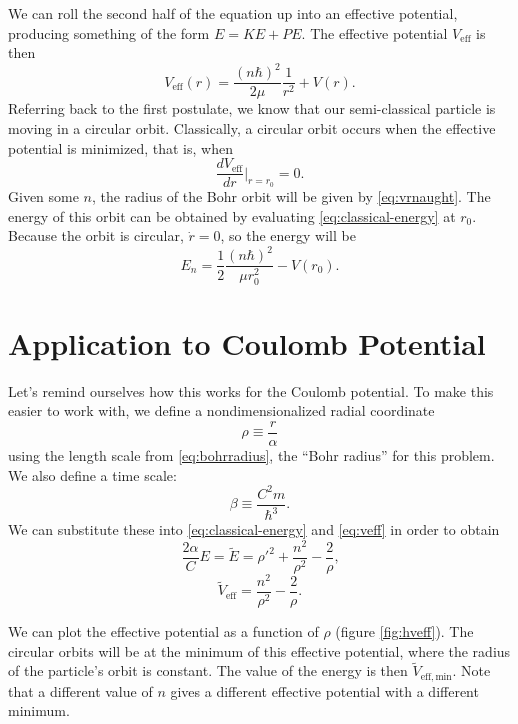 \documentclass[12pt,twoside]{reedthesis}
\newcommand{\eqn}[1]{\begin{equation}#1\end{equation}}
\begin{document}
We can roll the second half of the equation up into an effective potential, producing something of the form $E = KE + PE$. The effective potential $V_{\mathrm{eff}}$ is then
\eqn{
V_{\mathrm{eff}}(r)=\frac{(n \hbar)^2}{2 \mu}\frac{1}{r^2}+V(r)\mbox{.}
\label{eq:veff}
}
Referring back to the first postulate, we know that our semi-classical particle is moving in a circular orbit. Classically, a circular orbit occurs when the effective potential is minimized, that is, when
\eqn{
\frac{dV_{\mathrm{eff}}}{d r}\Big |_{r = r_0}= 0\mbox{.}
\label{eq:vrnaught}
}
Given some $n$, the radius of the Bohr orbit will be given by \eqref{eq:vrnaught}. The energy of this orbit can be obtained by evaluating \eqref{eq:classical-energy}
 at $r_0$. Because the orbit is circular, $\dot{r} = 0$, so the energy will be 
\eqn{
E_{n} = \frac{1}{2}\frac{(n\hbar)^2}{\mu r_0^2} - V(r_0)\mbox{.}
}

\section{Application to Coulomb Potential}
Let's remind ourselves how this works for the Coulomb potential. To make this easier to work with, we define a nondimensionalized radial coordinate
\begin{equation}
\rho \equiv \frac{r}{\alpha}
\label{eq:rho}
\end{equation}
using the length scale from \eqref{eq:bohrradius}, the ``Bohr radius'' for this problem.  
We also define a time scale:
\begin{equation}
\beta \equiv \frac{C^2m}{\hbar^3}\mbox{.}
\label{eq:beta}
\end{equation}
We can substitute these into \eqref{eq:classical-energy} and \eqref{eq:veff} in order to obtain 
\eqn{
\frac{2 \alpha}{C}E = \tilde{E}= \rho '^2 + \frac{n^2}{\rho^2}-\frac{2}{\rho}\mbox{,}
\label{eq:energy-nondim}
}
\eqn{
\tilde{V}_{\mathrm{eff}} = \frac{n^2}{\rho^2}-\frac{2}{\rho}\mbox{.}
\label{eq:veff-nondim}
}

We can plot the effective potential as a function of $\rho$ (figure \ref{fig:hveff}). The circular orbits will be at the minimum of this effective potential, where the radius of the particle's orbit is constant. The value of the energy is then $\tilde{V}_{\mathrm{eff,min}}$. Note that a different value of $n$ gives a different effective potential with a different minimum. 
\end{document}
